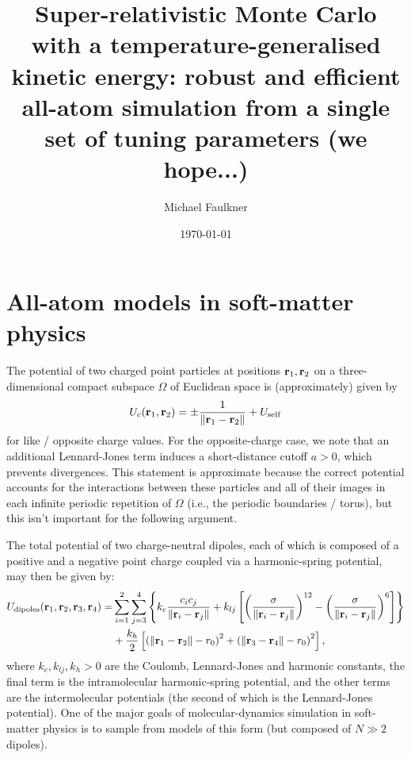 \documentclass[a4paper]{article}
\begin{document}
\title{Super-relativistic Monte Carlo with a temperature-generalised kinetic energy: robust and efficient all-atom simulation from a single set of tuning parameters (we hope...)}
\author{Michael Faulkner}
\date{\today}

\maketitle


\section{All-atom models in soft-matter physics}

The potential of two charged point particles at positions $\mathbf{r}_1, \mathbf{r}_2$ on a three-dimensional compact subspace $\Omega$ of Euclidean space is (approximately) given by
\begin{align}
U_c(\mathbf{r}_1, \mathbf{r}_2) = \pm \frac{1}{\left\lVert \mathbf{r}_1 - \mathbf{r}_2 \right\rVert} + U_{\rm{self}} 
\end{align}
for like / opposite charge values. For the opposite-charge case, we note that an additional Lennard-Jones term induces a short-distance cutoff $a > 0$, which prevents divergences. This statement is approximate because the correct potential accounts for the interactions between these particles and all of their images in each infinite periodic repetition of $\Omega$ (i.e., the periodic boundaries / torus), but this isn't important for the following argument. 

The total potential of two charge-neutral dipoles, each of which is composed of a positive and a negative point charge coupled via a harmonic-spring potential, may then be given by:
\begin{align}
U_{\rm dipoles} (\mathbf{r}_1, \mathbf{r}_2, \mathbf{r}_3, \mathbf{r}_4) =& \sum_{i = 1}^2 \sum_{j = 3}^4 \left\{ k_c \frac{c_i c_j}{\left\lVert \mathbf{r}_i - \mathbf{r}_j \right\rVert} + k_{lj} \left[ \left( \frac{\sigma}{\left\lVert \mathbf{r}_i - \mathbf{r}_j \right\rVert} \right)^{12} - \left( \frac{\sigma}{\left\lVert \mathbf{r}_i - \mathbf{r}_j \right\rVert} \right)^6 \right] \right\} \nonumber\\
&+ \frac{k_h}{2} \left[ \left( \left\lVert \mathbf{r}_1 - \mathbf{r}_2 \right\rVert - r_0 \right)^2 + \left( \left\lVert \mathbf{r}_3 - \mathbf{r}_4 \right\rVert - r_0 \right)^2 \right] ,
\end{align}
where $k_c, k_{lj}, k_h > 0$ are the Coulomb, Lennard-Jones and harmonic constants, the final term is the intramolecular harmonic-spring potential, and the other terms are the intermolecular potentials (the second of which is the Lennard-Jones potential). One of the major goals of molecular-dynamics simulation in soft-matter physics is to sample from models of this form (but composed of $N \gg 2$ dipoles). 
\end{document}

